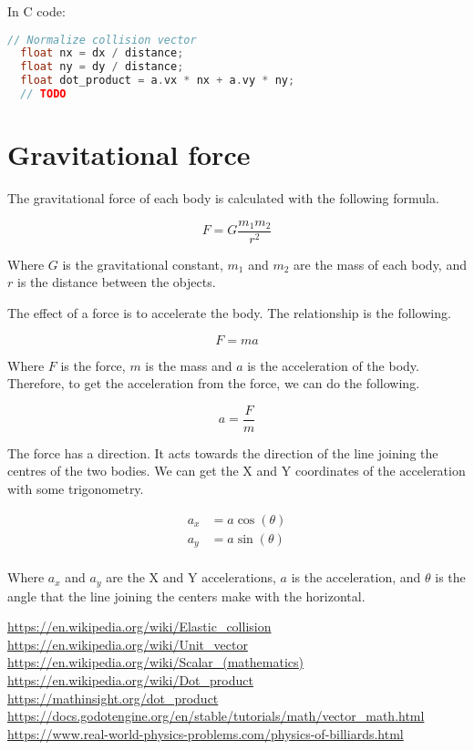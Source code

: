 \documentclass{amsart}
\begin{document}
In C code:

\begin{lstlisting}[language=C]
  // Normalize collision vector
  float nx = dx / distance;
  float ny = dy / distance;
  float dot_product = a.vx * nx + a.vy * ny;
  // TODO
\end{lstlisting}

\newpage

\section{Gravitational force}

The gravitational force of each body is calculated with the following formula.

\begin{displaymath}
  F = G \frac{m_1m_2}{r^2}
\end{displaymath}

Where $G$ is the gravitational constant, $m_1$ and $m_2$ are the mass of each
body, and $r$ is the distance between the objects.

The effect of a force is to accelerate the body. The relationship is the
following.

\begin{displaymath}
  F = m a
\end{displaymath}

Where $F$ is the force, $m$ is the mass and $a$ is the acceleration of the
body. Therefore, to get the acceleration from the force, we can do the
following.

\begin{displaymath}
  a = \frac{F}{m}
\end{displaymath}

The force has a direction. It acts towards the direction of the line joining
the centres of the two bodies. We can get the X and Y coordinates of the
acceleration with some trigonometry.

\begin{align*}
  a_x &= a \cos(\theta) \\
  a_y &= a \sin(\theta) \\
\end{align*}

Where $a_x$ and $a_y$ are the X and Y accelerations, $a$ is the acceleration,
and $\theta$ is the angle that the line joining the centers make with the
horizontal.

\newpage

\begin{thebibliography}{9}
  \url{https://en.wikipedia.org/wiki/Elastic_collision}
  \url{https://en.wikipedia.org/wiki/Unit_vector}
  \url{https://en.wikipedia.org/wiki/Scalar_(mathematics)}
  \url{https://en.wikipedia.org/wiki/Dot_product}
  \url{https://mathinsight.org/dot_product}
  \url{https://docs.godotengine.org/en/stable/tutorials/math/vector_math.html}
  \url{https://www.real-world-physics-problems.com/physics-of-billiards.html}
\end{thebibliography}
\end{document}
